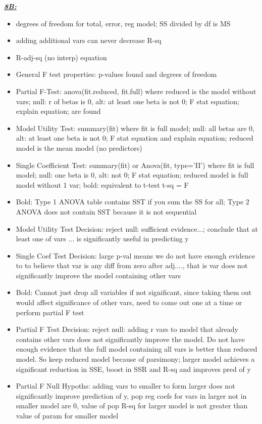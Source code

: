 \documentclass[8pt]{extarticle}
\begin{document}
\textit{\textbf{\underline{8B:}}}
\begin{itemize}
    \item degrees of freedom for total, error, reg model; SS divided by df is MS
    \item adding additional vars can never decrease R-sq
    \item R-adj-sq (no interp) equation
    \item General F test properties: p-values found and degrees of freedom
    \item Partial F-Test: anova(fit.reduced, fit.full) where reduced is the
    model without vars; null: r of betas is 0, alt: at least one beta is not 0; 
    F stat equation; explain equation; 
    are found
    \item Model Utility Test: summary(fit) where fit is full model; null: all 
    betas are 0, alt: at least one beta is not 0; F stat equation and explain 
    equation; reduced model is the mean model (no predictors)
    \item Single Coefficient Test: summary(fit) or Anova(fit, type='II') where 
    fit is full model; null: one beta is 0, alt: not 0; F stat equation; reduced 
    model is full model without 1 var; bold: equivalent to t-test t-sq = F
    \item Bold: Type 1 ANOVA table contains SST if you sum the SS for all;
    Type 2 ANOVA does not contain SST because it is not sequential
    \item Model Utility Test Decision: reject null: sufficient evidence...; 
    conclude that at least one of vars ... is significantly useful in 
    predicting y
    \item Single Coef Test Decision: large p-val means we do not have enough 
    evidence to to believe that var is any diff from zero after adj...., that 
    is var does not significantly improve the model containing other vars
    \item Bold: Cannot just drop all variables if not significant, since taking 
    them out would affect significance of other vars, need to come out one at a
    time or perform partial F test
    \item Partial F Test Decision: reject null: adding r vars to model that 
    already contains other vars does not significantly improve the model. Do 
    not have enough evidence that the full model containing all vars is better 
    than reduced model. So keep reduced model because of parsimony; larger model 
    achieves a significant reduction in SSE, boost in SSR and R-sq and improves 
    pred of y
    \item Partial F Null Hypoths: adding vars to smaller to form larger does not 
    significantly improve prediction of y, pop reg coefs for vars in larger not 
    in smaller model are 0, value of pop R-sq for larger model is not greater 
    than value of param for smaller model
\end{itemize}
\end{document}
